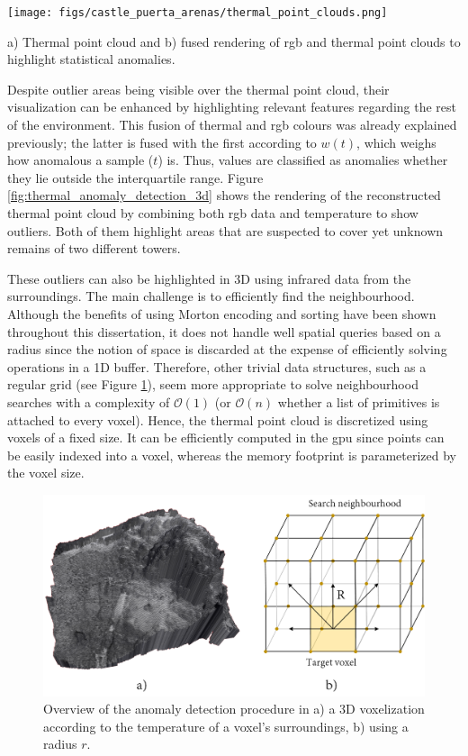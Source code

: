 \begin{marginfigure}[.2cm]
    \centering
    \texttt{[image: figs/castle\_puerta\_arenas/thermal\_point\_clouds.png]}
	\caption{a) Thermal point cloud and b) fused rendering of \acrshort{rgb} and thermal point clouds to highlight statistical anomalies.}
	\label{fig:thermal_anomaly_detection_3d}
\end{marginfigure}
Despite outlier areas being visible over the thermal point cloud, their visualization can be enhanced by highlighting relevant features regarding the rest of the environment. This fusion of thermal and \acrshort{rgb} colours was already explained previously; the latter is fused with the first according to $w(t)$, which weighs how anomalous a sample ($t$) is. Thus, values are classified as anomalies whether they lie outside the interquartile range. Figure \ref{fig:thermal_anomaly_detection_3d} shows the rendering of the reconstructed thermal point cloud by combining both \acrshort{rgb} data and temperature to show outliers. Both of them highlight areas that are suspected to cover yet unknown remains of two different towers. 

These outliers can also be highlighted in 3D using infrared data from the surroundings. The main challenge is to efficiently find the neighbourhood. Although the benefits of using Morton encoding and sorting have been shown throughout this dissertation, it does not handle well spatial queries based on a radius since the notion of space is discarded at the expense of efficiently solving operations in a 1D buffer. Therefore, other trivial data structures, such as a regular grid (see Figure \ref{fig:voxel_anomalies_scheme}), seem more appropriate to solve neighbourhood searches with a complexity of $\mathcal{O}(1)$ (or $\mathcal{O}(n)$ whether a list of primitives is attached to every voxel). Hence, the thermal point cloud is discretized using voxels of a fixed size. It can be efficiently computed in the \acrshort{gpu} since points can be easily indexed into a voxel, whereas the memory footprint is parameterized by the voxel size.

\begin{figure}[ht]
    \centering
    \includegraphics[width=\linewidth]{figs/castle_puerta_arenas/voxel_anomalies.png}
	\caption{Overview of the anomaly detection procedure in a) a 3D voxelization according to the temperature of a voxel's surroundings, b) using a radius $r$.}
	\label{fig:voxel_anomalies_scheme}
\end{figure}

